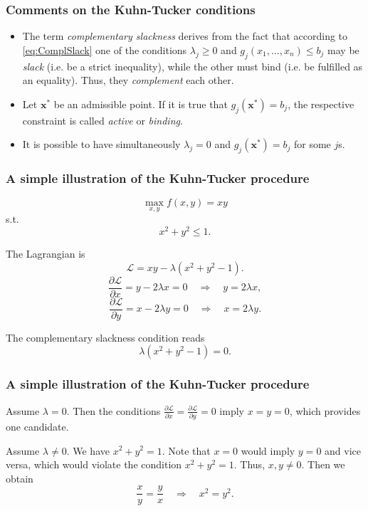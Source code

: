 \documentclass[10pt]{beamer}
\theoremstyle{definition}
\begin{document}
\begin{frame}[fragile]
\frametitle{Comments on the Kuhn-Tucker conditions}
\begin{itemize}
\item The term \emph{complementary slackness} derives from the fact that according to \eqref{eq:ComplSlack} one of the conditions $ \lambda_j \geq 0 $ and $ g_j(x_1,\ldots,x_n) \leq b_j $ may be \emph{slack} (i.e. be a strict inequality), while the other must bind (i.e. be fulfilled as an equality). Thus, they \emph{complement} each other. \bigskip
\item Let $ \mathbf{x^*} $ be an admissible point. If it is true that $ g_j(\mathbf{x^*})=b_j $, the respective constraint is called \emph{active} or \emph{binding}. \bigskip
\item It is possible to have simultaneously $ \lambda_j = 0 $ and $ g_j(\mathbf{x^*})=b_j $ for some $ j $s. 
\end{itemize}
\end{frame}

\begin{frame}[fragile]
\frametitle{A simple illustration of the Kuhn-Tucker procedure}
\begin{example}
\[ \max_{x,y} f(x,y) = xy \]
s.t. \[ x^2+y^2 \leq 1. \]

The Lagrangian is
\[ \mathcal{L} = xy - \lambda (x^2+y^2-1). \]
\[ \dfrac{\partial \mathcal{L}}{\partial x} = y-2\lambda x=0 \quad \Rightarrow \quad y = 2\lambda x, \]
\[ \dfrac{\partial \mathcal{L}}{\partial y} = x-2\lambda y=0 \quad \Rightarrow \quad x = 2\lambda y. \]

The complementary slackness condition reads \[ \lambda (x^2+y^2-1)=0. \]
\label{ex:KTillustrated}
\end{example}
\end{frame}

\begin{frame}[fragile]
\frametitle{A simple illustration of the Kuhn-Tucker procedure}\addtocounter{theorem}{-1}
\begin{example}[cont.]
Assume $ \lambda = 0 $. Then the conditions $ \frac{\partial \mathcal{L}}{\partial x}=\frac{\partial \mathcal{L}}{\partial y}=0 $ imply $ x=y=0$, which provides one candidate.\bigskip

Assume $ \lambda \neq 0 $. We have $ x^2+y^2 = 1 $. Note that $ x=0 $ would imply $ y=0 $ and vice versa, which would violate the condition $ x^2+y^2 = 1 $. Thus, $ x,y \neq 0 $. Then we obtain \[ \dfrac{x}{y}=\dfrac{y}{x} \quad \Rightarrow \quad x^2 = y^2. \]\bigskip
\end{example}
\end{frame}
\end{document}
